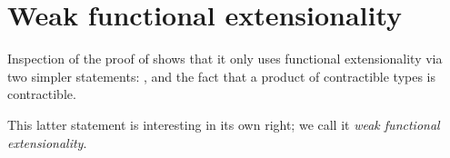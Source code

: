 \documentclass[12pt]{report}
\begin{document}
\section{Weak functional extensionality}

\begin{coqdoccode}
\coqdocemptyline
\end{coqdoccode}
Inspection of the proof of  shows that it only uses functional extensionality via two simpler statements: , and the fact that a product of contractible types is contractible.


  This latter statement is interesting in its own right; we call it \textit{weak functional extensionality}.  
\end{document}
